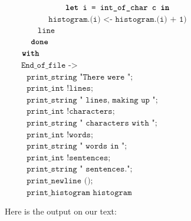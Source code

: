 \documentclass[]{book}
\newcommand{\plet}{\textbf{let}\xspace}
\newcommand{\pin}{\textbf{in}\xspace}
\newcommand{\pwith}{\textbf{with}\xspace}
\newcommand{\pdone}{\textbf{done}\xspace}
\newcommand{\smspace}{\vspace{4mm}}
\begin{document}
{\begin{minipage}{\textwidth}
$\texttt{~~~~~~~~~~~~~~\plet i = int\_of\_char c \pin}$\\
$\texttt{~~~~~~~~~~~~~~~~histogram.(i) <- histogram.(i) + 1)}$\hfill{}\\
$\texttt{~~~~~~~~~~~~line}$\\
$\texttt{~~~~~~\pdone}$\\
$\texttt{~~~~\pwith}$\\
$\texttt{~~~~~~End\_of\_file ->}$\\
$\texttt{~~~~~~~~print\_string "There were ";}$\\
$\texttt{~~~~~~~~print\_int !lines;}$\\
$\texttt{~~~~~~~~print\_string " lines, making up ";}$\\
$\texttt{~~~~~~~~print\_int !characters;}$\\
$\texttt{~~~~~~~~print\_string " characters with ";}$\\
$\texttt{~~~~~~~~print\_int !words;}$\\
$\texttt{~~~~~~~~print\_string " words in ";}$\\
$\texttt{~~~~~~~~print\_int !sentences;}$\\
$\texttt{~~~~~~~~print\_string " sentences.";}$\\
$\texttt{~~~~~~~~print\_newline ();}$\\
$\texttt{~~~~~~~~print\_histogram histogram}$\hfill{}\vphantom{g}
\end{minipage}}
\smspace

\noindent Here is the output on our text:
\end{document}
